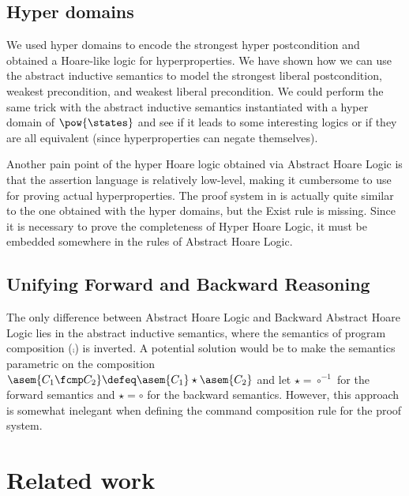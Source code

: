 \subsection{Hyper domains}
We used hyper domains to encode the strongest hyper postcondition and obtained
a Hoare-like logic for hyperproperties. We have shown how we can use the
abstract inductive semantics to model the strongest liberal postcondition,
weakest precondition, and weakest liberal precondition. We could perform the
same trick with the abstract inductive semantics instantiated with a hyper
domain of $\pow{\states}$ and see if it leads to some interesting logics or if
they are all equivalent (since hyperproperties can negate themselves).

Another pain point of the hyper Hoare logic obtained via Abstract Hoare Logic
is that the assertion language is relatively low-level, making it cumbersome to
use for proving actual hyperproperties. The proof system in \cite{Darnier2023}
is actually quite similar to the one obtained with the hyper domains, but the
Exist rule is missing. Since it is necessary to prove the completeness of Hyper
Hoare Logic, it must be embedded somewhere in the rules of Abstract Hoare
Logic.

\subsection{Unifying Forward and Backward Reasoning}
The only difference between Abstract Hoare Logic and Backward Abstract Hoare
Logic lies in the abstract inductive semantics, where the semantics of program
composition ($\fcmp$) is inverted. A potential solution would be to make the
semantics parametric on the composition $\asem{C_1 \fcmp C_2} \defeq \asem{C_1}
\star \asem{C_2}$ and let $\star = \circ^{-1}$ for the forward semantics and
$\star = \circ$ for the backward semantics. However, this approach is somewhat
inelegant when defining the command composition rule for the proof system.

\section{Related work}


